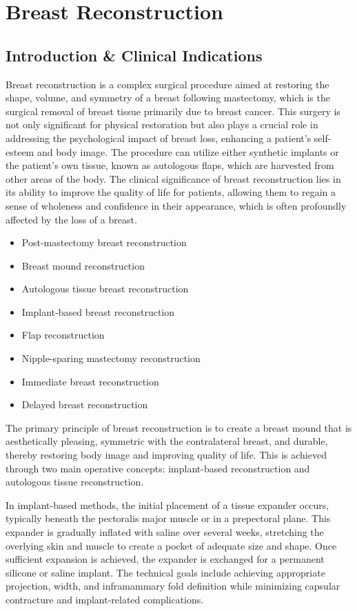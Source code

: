 \chapter{Breast Reconstruction}

\section*{Introduction \& Clinical Indications}
Breast reconstruction is a complex surgical procedure aimed at restoring the shape, volume, and symmetry of a breast following mastectomy, which is the surgical removal of breast tissue primarily due to breast cancer. This surgery is not only significant for physical restoration but also plays a crucial role in addressing the psychological impact of breast loss, enhancing a patient's self-esteem and body image. The procedure can utilize either synthetic implants or the patient's own tissue, known as autologous flaps, which are harvested from other areas of the body. The clinical significance of breast reconstruction lies in its ability to improve the quality of life for patients, allowing them to regain a sense of wholeness and confidence in their appearance, which is often profoundly affected by the loss of a breast.

\begin{itemize}
  \item Post-mastectomy breast reconstruction
  \item Breast mound reconstruction
  \item Autologous tissue breast reconstruction
  \item Implant-based breast reconstruction
  \item Flap reconstruction
  \item Nipple-sparing mastectomy reconstruction
  \item Immediate breast reconstruction
  \item Delayed breast reconstruction
\end{itemize}

The primary principle of breast reconstruction is to create a breast mound that is aesthetically pleasing, symmetric with the contralateral breast, and durable, thereby restoring body image and improving quality of life. This is achieved through two main operative concepts: implant-based reconstruction and autologous tissue reconstruction. 

In implant-based methods, the initial placement of a tissue expander occurs, typically beneath the pectoralis major muscle or in a prepectoral plane. This expander is gradually inflated with saline over several weeks, stretching the overlying skin and muscle to create a pocket of adequate size and shape. Once sufficient expansion is achieved, the expander is exchanged for a permanent silicone or saline implant. The technical goals include achieving appropriate projection, width, and inframammary fold definition while minimizing capsular contracture and implant-related complications.

